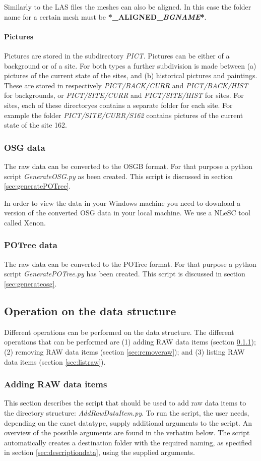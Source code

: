 Similarly to the LAS files the meshes can also be aligned. In this case the folder name for a certain mesh must be \textbf{*\_ALIGNED\_\textit{BGNAME}*}. 

\paragraph{Pictures}
Pictures are stored in the subdirectory \textit{PICT}. Pictures can be either of a background or of a site. For both types a further subdivision is made between (a) pictures of the current state of the sites, and (b) historical pictures and paintings. These are stored in respectively \textit{PICT/BACK/CURR} and \textit{PICT/BACK/HIST} for backgrounds, or \textit{PICT/SITE/CURR} and \textit{PICT/SITE/HIST} for sites. For sites, each of these directoryes contains a separate folder for each site. For example the folder \textit{PICT/SITE/CURR/S162} contains pictures of the current state of the site 162.

\subsubsection{OSG data}
The raw data can be converted to the OSGB format. For that purpose a python script \textit{GenerateOSG.py} as been created. This script is discussed in section \ref{sec:generatePOTree}. 

In order to view the data in your Windows machine you need to download a version of the converted OSG data in your local machine. We use a NLeSC tool called Xenon.

\subsubsection{POTree data}
The raw data can be converted to the POTree format. For that purpose a python script \textit{GeneratePOTree.py} has been created. This script is discussed in section \ref{sec:generateosg}.

\subsection{Operation on the data structure}
Different operations can be performed on the data structure. The different operations that can be performed are (1) adding RAW data items (section \ref{sec:addraw}); (2) removing RAW data items (section \ref{sec:removeraw}); and (3) listing RAW data items (section \ref{sec:listraw}).

\subsubsection{Adding RAW data items}
\label{sec:addraw}
This section describes the script that should be used to add raw data items to the directory structure: \textit{AddRawDataItem.py}. To run the script, the user needs, depending on the exact datatype, supply additional arguments to the script. An overview of the possible arguments are found in the verbatim below. The script automatically creates a destination folder with the required naming, as specified in section \ref{sec:descriptiondata}, using the supplied arguments.

